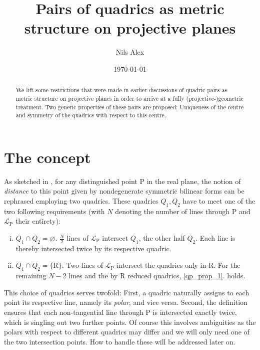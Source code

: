 \documentclass[12pt,english,paper=a4,DIV=12,headings=small,numbers=noenddot,parskip=half]{scrartcl}
\theoremstyle{definition}
\begin{document}
\title{Pairs of quadrics as metric structure on projective planes}
\author{Nils Alex}
\date{\today}

\maketitle

\begin{abstract}
We lift some restrictions that were made in earlier discussions of quadric pairs as metric structure on projective planes in order to arrive at a fully (projective-)geometric treatment. Two generic properties of these pairs are proposed: Uniqueness of the centre and symmetry of the quadrics with respect to this centre.
\end{abstract}

\section{The concept}

As sketched in \cite{Alex:Th12, Alex:2013}, for any distinguished point $\mathrm{P}$ in the real plane, the notion of \emph{distance} to this point given by nondegenerate symmetric bilinear forms can be rephrased employing two quadrics. These quadrics $Q_1, Q_2$ have to meet one of the two following requirements (with $N$ denoting the number of lines through $\mathrm{P}$ and $\mathscr{L}_\mathrm{P}$ their entirety):
\begin{enumerate}[i.]
\item{$Q_1 \cap Q_2 = \varnothing$. $\frac{N}{2}$ lines of $\mathscr{L}_\mathrm{P}$ intersect $Q_1$, the other half $Q_2$. Each line is thereby intersected twice by its respective quadric.\label{qp_prop_1}} 
\item{$Q_1 \cap Q_2 = \{ \mathrm{R} \}$. Two lines of $\mathscr{L}_\mathrm{P}$ intersect the quadrics only in $\mathrm{R}$. For the remaining $N-2$ lines and the by $\mathrm{R}$ reduced quadrics, \ref{qp_prop_1}. holds.}
\end{enumerate}

This choice of quadrics serves twofold: First, a quadric naturally assigns to each point its respective line, namely its \emph{polar}, and vice versa. Second, the definition ensures that each non-tangential line through $\mathrm{P}$ is intersected exactly twice, which is singling out two further points. Of course this involves ambiguities as the polars with respect to different quadrics may differ and we will only need one of the two intersection points. How to handle these will be addressed later on.
\end{document}
